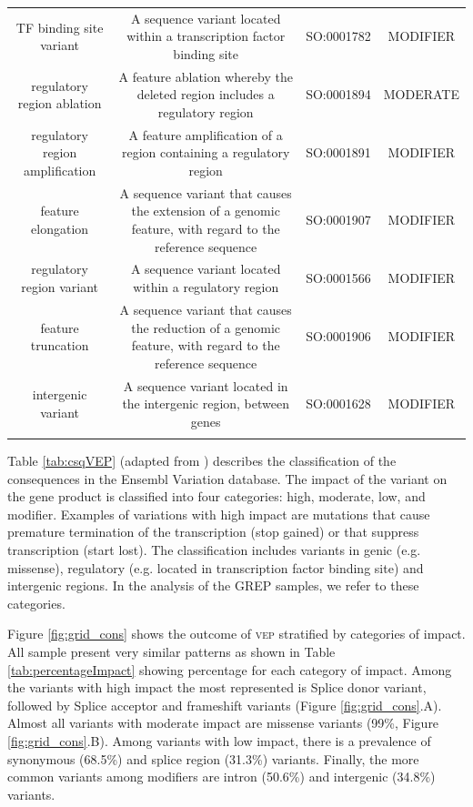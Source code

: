 {\begin{table}
\begin{adjustbox}{width=1\textwidth}
\begin{tabular}{c c c c}
TF binding site variant & A sequence variant located within a transcription factor binding site & SO:0001782 & MODIFIER \\
regulatory region ablation & A feature ablation whereby the deleted region includes a regulatory region & SO:0001894 & MODERATE \\
regulatory region amplification & A feature amplification of a region containing a regulatory region & SO:0001891 & MODIFIER \\
feature elongation & A sequence variant that causes the extension of a genomic feature, with regard to the reference sequence & SO:0001907 & MODIFIER \\
regulatory region variant & A sequence variant located within a regulatory region & SO:0001566 & MODIFIER \\
feature truncation & A sequence variant that causes the reduction of a genomic feature, with regard to the reference sequence & SO:0001906 & MODIFIER \\
intergenic variant & A sequence variant located in the intergenic region, between genes & SO:0001628 & MODIFIER \\
\bottomrule\\
\end{tabular}
\end{adjustbox}
\end{table}
}

Table \ref{tab:csqVEP} (adapted from \cite{mclaren2016ensembl}) describes the classification of the consequences in the Ensembl Variation database. The impact of the variant on the gene product is classified into four categories: high, moderate, low, and modifier. Examples of variations with high impact are mutations that cause premature termination of the transcription (stop gained) or that suppress transcription (start lost). The classification includes variants in genic (e.g. missense), regulatory (e.g. located in transcription factor binding site) and intergenic regions. In the analysis of the GREP samples, we refer to these categories. 



Figure \ref{fig:grid_cons} shows the outcome of \textsc{vep} stratified by categories of impact. All sample present very similar patterns as shown in Table \ref{tab:percentageImpact} showing percentage for each category of impact. Among the variants with high impact the most represented is Splice donor variant, followed by Splice acceptor and frameshift variants (Figure \ref{fig:grid_cons}.A). Almost all variants with moderate impact are missense variants (99\%, Figure \ref{fig:grid_cons}.B). Among variants with low impact, there is a prevalence of synonymous (68.5\%) and splice region (31.3\%) variants. Finally, the more common variants among modifiers are intron (50.6\%) and intergenic (34.8\%) variants. 

